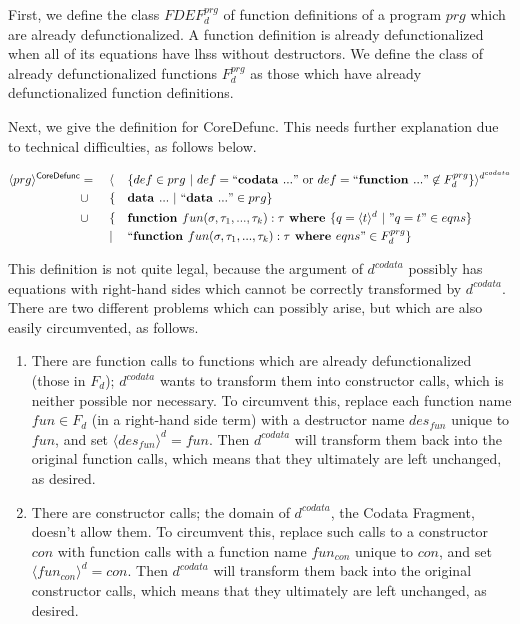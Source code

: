 \begin{algorithm}

First, we define the class $FDEF^{prg}_d$ of function definitions of a program $prg$ which are already defunctionalized. A function definition is already defunctionalized when all of its equations have lhss without destructors. We define the class of already defunctionalized functions $F^{prg}_d$ as those which have already defunctionalized function definitions.

Next, we give the definition for \textsf{CoreDefunc}. This needs further explanation due to technical difficulties, as follows below.

\begin{alignat*}{3}
\langle prg \rangle^{\textsf{CoreDefunc}} & = ~&& \langle && \{ def \in prg ~ | ~ def = ``\textbf{codata } ..." \text{ or } def = ``\textbf{function } ..." \not\in F^{prg}_d \} \rangle^{d^{codata}} \\
& \cup && \{ && \textrm{\textbf{data }} ... ~ | ~ `` \textrm{\textbf{data }} ... " \in prg \} \\
& \cup && \{ && \textrm{\textbf{function }} fun(\sigma, \tau_1, ..., \tau_k): \tau \textrm{\textbf{ where }} \{ q = \langle t \rangle^d ~ | ~ "q = t" \in eqns \} \\
& && | && `` \textrm{\textbf{function }} fun(\sigma, \tau_1, ..., \tau_k): \tau \textrm{\textbf{ where }} eqns " \in F^{prg}_d \} 
\end{alignat*}

This definition is not quite legal, because the argument of $d^{codata}$ possibly has equations with right-hand sides which cannot be correctly transformed by $d^{codata}$. There are two different problems which can possibly arise, but which are also easily circumvented, as follows.
\begin{enumerate}
\item There are function calls to functions which are already defunctionalized (those in $F_d$); $d^{codata}$ wants to transform them into constructor calls, which is neither possible nor necessary. To circumvent this, replace each function name $fun \in F_d$ (in a right-hand side term) with a destructor name $des_{fun}$ unique to $fun$, and set $\langle des_{fun} \rangle^d = fun$. Then $d^{codata}$ will transform them back into the original function calls, which means that they ultimately are left unchanged, as desired.

\item There are constructor calls; the domain of $d^{codata}$, the Codata Fragment, doesn't allow them. To circumvent this, replace such calls to a constructor $con$ with function calls with a function name $fun_{con}$ unique to $con$, and set $\langle fun_{con} \rangle^d = con$. Then $d^{codata}$ will transform them back into the original constructor calls, which means that they ultimately are left unchanged, as desired.
\end{enumerate}


\end{algorithm}
